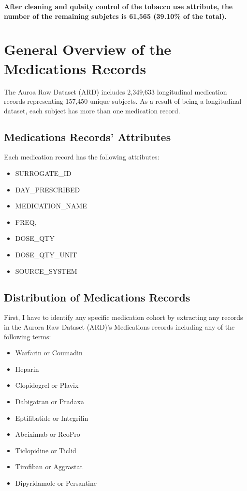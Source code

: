 \documentclass{article}
\begin{document}
\textbf{After cleaning and qulaity control of the tobacco use attribute, the number of the remaining subjetcs is 61,565 (39.10\% of the total).}





\section{General Overview of the Medications Records}
The Auroa Raw Dataset (ARD) includes 2,349,633 longitudinal medication records representing 157,450 unique subjects. As a result of being a longitudinal dataset, each subject has more than one medication record. 

\subsection{Medications Records' Attributes}
Each medication record has the following attributes:
\begin{itemize}
  \item SURROGATE\_ID
  \item DAY\_PRESCRIBED
  \item MEDICATION\_NAME
  \item FREQ, 
  \item DOSE\_QTY
  \item DOSE\_QTY\_UNIT
  \item SOURCE\_SYSTEM
\end{itemize}


\subsection{Distribution of Medications Records}
First, I have to identify any specific medication cohort by extracting any records in the Aurora Raw Dataset (ARD)'s Medications records including any of the following terms:
\begin{itemize}
  \item Warfarin or Coumadin
  \item Heparin
  \item Clopidogrel or Plavix
  \item Dabigatran or Pradaxa
  \item Eptifibatide or Integrilin
  \item Abciximab or ReoPro
  \item Ticlopidine or Ticlid
  \item Tirofiban or Aggrastat
  \item Dipyridamole or Persantine
\end{itemize}
\end{document}

